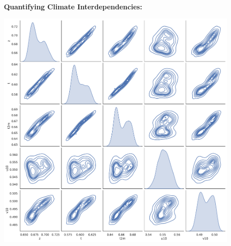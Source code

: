 \documentclass[landscape,a1paper,fontscale=0.424]{baposter}
\begin{document}
\begin{poster}
{\begin{minipage}[t]{0.50\textwidth}
            \textbf{\color{blue}Quantifying Climate Interdependencies:}
            \vspace{-0.5em}
            \begin{center}
                \includegraphics[width=0.9\textwidth]{pairwise.pdf}
            \end{center}
        \end{minipage}

}
\end{poster}
\end{document}
